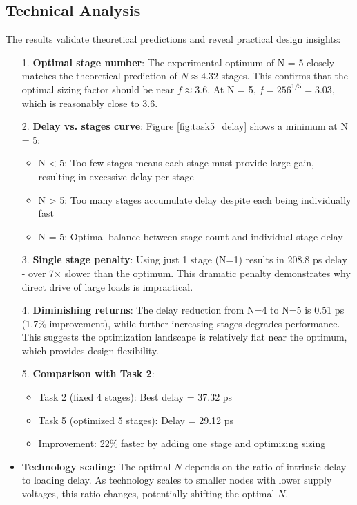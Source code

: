 \documentclass[UTF8,12pt,a4paper]{ctexart}
\begin{document}
\subsection{Technical Analysis}

The results validate theoretical predictions and reveal practical design insights:

\begin{itemize}
    \item[1. ] \textbf{Optimal stage number}: The experimental optimum of N = 5 closely matches the theoretical prediction of $N \approx 4.32$ stages. This confirms that the optimal sizing factor should be near $f \approx 3.6$. At N = 5, $f = 256^{1/5} = 3.03$, which is reasonably close to 3.6.

    \item[2. ] \textbf{Delay vs. stages curve}: Figure \ref{fig:task5_delay} shows a minimum at N = 5:
    \begin{itemize}
        \item N < 5: Too few stages means each stage must provide large gain, resulting in excessive delay per stage
        \item N > 5: Too many stages accumulate delay despite each being individually fast
        \item N = 5: Optimal balance between stage count and individual stage delay
    \end{itemize}
    
    \item[3. ] \textbf{Single stage penalty}: Using just 1 stage (N=1) results in 208.8 ps delay - over 7× slower than the optimum. This dramatic penalty demonstrates why direct drive of large loads is impractical.
    
    \item[4. ] \textbf{Diminishing returns}: The delay reduction from N=4 to N=5 is 0.51 ps (1.7\% improvement), while further increasing stages degrades performance. This suggests the optimization landscape is relatively flat near the optimum, which provides design flexibility.
    
    \item[5. ] \textbf{Comparison with Task 2}: 
    \begin{itemize}
        \item Task 2 (fixed 4 stages): Best delay = 37.32 ps
        \item Task 5 (optimized 5 stages): Delay = 29.12 ps
        \item Improvement: 22\% faster by adding one stage and optimizing sizing
    \end{itemize}


    \item \textbf{Technology scaling}: The optimal $N$ depends on the ratio of intrinsic delay to loading delay. As technology scales to smaller nodes with lower supply voltages, this ratio changes, potentially shifting the optimal $N$.
\end{itemize}
\end{document}
